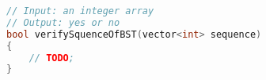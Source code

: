 \documentclass[12pt,a4paper]{article}
\makeatletter
\newtheorem*{solution}{Solution}
\theoremstyle{definition}
\renewenvironment{solution}[1][Solution] {\par\pushQED{\qed}\normalfont\topsep6\p@\@plus6\p@\relax\trivlist\item[\hskip\labelsep\bfseries#1\@addpunct{.}]\ignorespaces}{\popQED\endtrivlist\@endpefalse} \makeatother
\makeatother
\begin{document}
\begin{enumerate}
\begin{lstlisting}[language=C++]
// Input: an integer array
// Output: yes or no
bool verifySquenceOfBST(vector<int> sequence)
{
	// TODO;
}
\end{lstlisting}


\end{enumerate}

\end{document}
